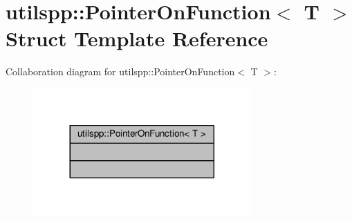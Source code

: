 \hypertarget{structutilspp_1_1PointerOnFunction}{\section{utilspp\-:\-:Pointer\-On\-Function$<$ T $>$ Struct Template Reference}
\label{structutilspp_1_1PointerOnFunction}
}


Collaboration diagram for utilspp\-:\-:Pointer\-On\-Function$<$ T $>$\-:\nopagebreak
\begin{figure}[H]
\begin{center}
\leavevmode
\includegraphics[width=236pt]{structutilspp_1_1PointerOnFunction__coll__graph}
\end{center}
\end{figure}
